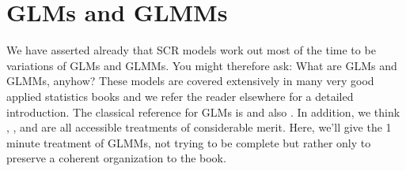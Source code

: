 \section{
GLMs and GLMMs}
\label{glms.sec.glmms}
We have asserted already that SCR models work out most of the time to
be variations of GLMs and GLMMs. You might therefore ask: What
are GLMs and GLMMs, anyhow?   These models are covered extensively in
many very good applied statistics books and we refer the reader
elsewhere for a detailed introduction.  The
classical reference for GLMs is \citet{nelder_wedderburn:1972} and
also \citet{mccullagh_nelder:1989}. In addition, we think \citet{kery:2010},
\citet{kery_schaub:2011}, and \citet{zuur_etal:2009} are all
accessible treatments of considerable merit. 
Here, we'll give the 1
minute
treatment of GLMMs, not trying to be complete but rather only
to preserve a coherent organization to the book.


